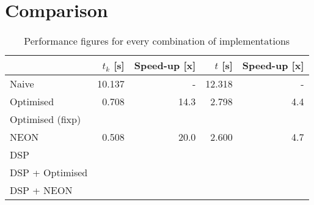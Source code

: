 \documentclass[final]{article}
\begin{document}
\section{Comparison}
\label{sec:comparison}

\begin{table}[H]
	\centering
	\caption{Performance figures for every combination of implementations}
	\begin{tabular}{lrrrr}
		\toprule
							& $t_k$ [s]	& Speed-up [x]	& $t$ [s]	& Speed-up [x]	\\
		\midrule
		Naive				& 10.137	& -			 	& 12.318	& -				\\
		Optimised			&  0.708	& 14.3		 	&  2.798	& 4.4			\\
		Optimised (fixp)	& 			& 			 	& 			& 				\\
		NEON				&  0.508	& 20.0		 	&  2.600	& 4.7			\\
		DSP					& 			& 			 	& 			& 				\\
		DSP + Optimised		& 			& 			 	& 			& 				\\
		DSP + NEON			& 			& 			 	& 			& 				\\
		\bottomrule
	\end{tabular}
	\label{tab:comparison}
\end{table}
\end{document}
